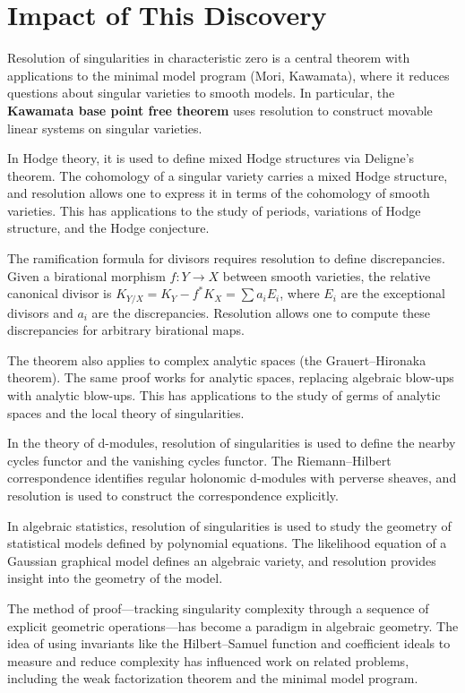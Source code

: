 \section{Impact of This Discovery}

Resolution of singularities in characteristic zero is a central theorem with applications to the minimal model program (Mori, Kawamata), where it reduces questions about singular varieties to smooth models. In particular, the \textbf{Kawamata base point free theorem} uses resolution to construct movable linear systems on singular varieties.

In Hodge theory, it is used to define mixed Hodge structures via Deligne's theorem. The cohomology of a singular variety carries a mixed Hodge structure, and resolution allows one to express it in terms of the cohomology of smooth varieties. This has applications to the study of periods, variations of Hodge structure, and the Hodge conjecture.

The ramification formula for divisors requires resolution to define discrepancies. Given a birational morphism $f: Y \to X$ between smooth varieties, the relative canonical divisor is $K_{Y/X} = K_Y - f^* K_X = \sum a_i E_i$, where $E_i$ are the exceptional divisors and $a_i$ are the discrepancies. Resolution allows one to compute these discrepancies for arbitrary birational maps.

The theorem also applies to complex analytic spaces (the Grauert--Hironaka theorem). The same proof works for analytic spaces, replacing algebraic blow-ups with analytic blow-ups. This has applications to the study of germs of analytic spaces and the local theory of singularities.

In the theory of d-modules, resolution of singularities is used to define the nearby cycles functor and the vanishing cycles functor. The Riemann--Hilbert correspondence identifies regular holonomic d-modules with perverse sheaves, and resolution is used to construct the correspondence explicitly.

In algebraic statistics, resolution of singularities is used to study the geometry of statistical models defined by polynomial equations. The likelihood equation of a Gaussian graphical model defines an algebraic variety, and resolution provides insight into the geometry of the model.

The method of proof---tracking singularity complexity through a sequence of explicit geometric operations---has become a paradigm in algebraic geometry. The idea of using invariants like the Hilbert--Samuel function and coefficient ideals to measure and reduce complexity has influenced work on related problems, including the weak factorization theorem and the minimal model program.

